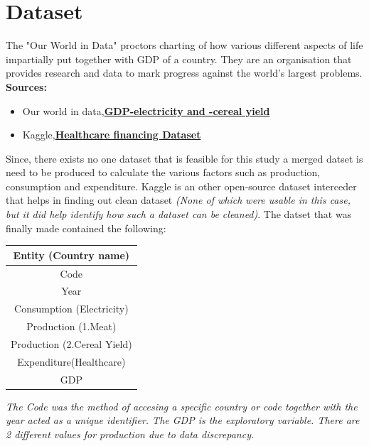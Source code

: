 \documentclass[conference]{IEEEtran}
\begin{document}
\section{Dataset}
The "Our World in Data" proctors charting of how various different aspects of life impartially put together with GDP of a country. They are an organisation that provides research and data to mark progress against the world's largest problems.
\textbf{Sources:}\\
\begin{itemize}
    \item Our world in data,\textbf{\href{https://ourworldindata.org/}{GDP-electricity and -cereal yield}}
    \item Kaggle,\textbf{\href{https://www.kaggle.com/datasets/programmerrdai/financing-healthcare}{Healthcare financing Dataset}}
\end{itemize}
Since, there exists no one dataset that is feasible for this study a merged datset is need to be produced to calculate the various factors such as production, consumption and expenditure.
Kaggle is an other open-source dataset interceder that helps in finding out clean dataset \emph{(None of which were usable in this case, but it did help identify how such a dataset can be cleaned)}.
The datset that was finally made contained the following:
\begin{center}
    \begin{tabular}{ |c| }
        \hline
        Entity (Country name)       \\
        \hline
        Code                        \\
        \hline
        Year                        \\
        \hline
        Consumption (Electricity)   \\
        \hline
        Production (1.Meat)         \\
        Production (2.Cereal Yield) \\
        \hline
        Expenditure(Healthcare)     \\
        \hline
        GDP                         \\
        \hline
    \end{tabular}
\end{center}
\bigskip
\emph{The Code was the method of accesing a specific country or code together with the year acted as a unique identifier. The GDP is the exploratory variable. There are 2 different values for production due to data discrepancy.}
\end{document}
